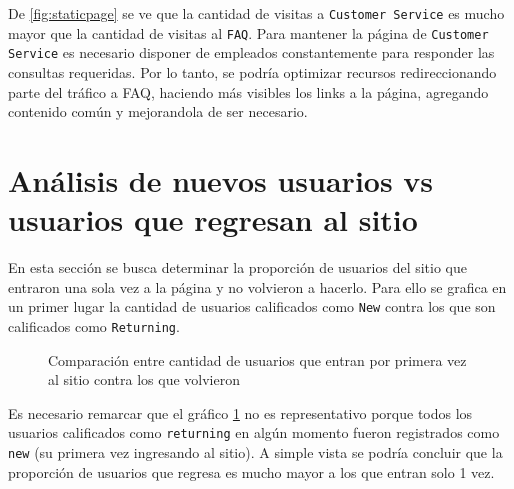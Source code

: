 \documentclass[a4paper]{article}
\begin{document}
De \ref{fig:staticpage} se ve que la cantidad de visitas a \texttt{Customer Service} es mucho mayor que la cantidad de visitas al \texttt{FAQ}. Para mantener la página de \texttt{Customer Service} es necesario disponer de empleados constantemente para responder las consultas requeridas. Por lo tanto, se podría optimizar recursos redireccionando parte del tráfico a FAQ, haciendo más visibles los links a la página, agregando contenido común y mejorandola de ser necesario.

\section{Análisis de nuevos usuarios vs usuarios que regresan al sitio}

En esta sección se busca determinar la proporción de usuarios del sitio que entraron una sola vez a la página y no volvieron a hacerlo. Para ello se grafica en un primer lugar la cantidad de usuarios calificados como \texttt{New} contra los que son calificados como \texttt{Returning}.

\begin{figure}[h!]
	\caption{Comparación entre cantidad de usuarios que entran por primera vez al sitio contra los que volvieron}
	\label{fig:newvsreturningfalse}
\end{figure}

Es necesario remarcar que el gráfico \ref{fig:newvsreturningfalse} no es representativo porque todos los usuarios calificados como \texttt{returning} en algún momento fueron registrados como \texttt{new} (su primera vez ingresando al sitio). A simple vista se podría concluir que la proporción de usuarios que regresa es mucho mayor a los que entran solo 1 vez. 
\end{document}
